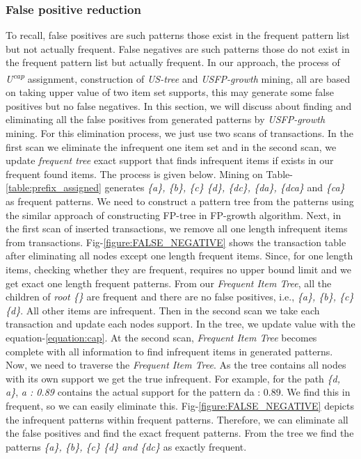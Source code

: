 \documentclass[conference]{IEEEtran}
\begin{document}
\subsubsection{False positive reduction}
To recall, false positives are such patterns those exist in the frequent pattern list but not actually frequent. False negatives are such patterns those do not exist in the frequent pattern list but actually frequent. In our approach, the process of \emph{U\textsuperscript{cap}} assignment, construction of \emph{US-tree} and \emph{USFP-growth} mining, all are based on taking upper value of two item set supports, this may generate some false positives but no false negatives. In this section, we will discuss about finding and eliminating all the false positives from generated patterns by \emph{USFP-growth} mining. For this elimination process, we just use two scans of transactions. In the first scan we eliminate the infrequent one item set and in the second scan, we update \emph{frequent tree} exact support that finds infrequent items if exists in our frequent found items. The process is given below. 
Mining on Table-\ref{table:prefix_assigned} generates \emph{\{a\}, \{b\}, \{c\} \{d\}, \{dc\}, \{da\}, \{dca\}} and \emph{\{ca\}} as frequent patterns. We need to construct a pattern tree from the patterns using the similar approach of constructing FP-tree in FP-growth algorithm.
Next, in the first scan of inserted transactions, we remove all one length infrequent items from transactions. Fig-\ref{figure:FALSE_NEGATIVE} shows the transaction table after eliminating all nodes except one length frequent items. Since, for one length items, checking whether they are frequent, requires no upper bound limit and we get exact one length frequent patterns. From our \emph{Frequent Item Tree}, all the children of \emph{root \{\}} are frequent and there are no false positives, i.e., \emph{\{a\}, \{b\}, \{c\} \{d\}}. All other items are infrequent. Then in the second scan we take each transaction and update each nodes support. In the tree, we update value with the equation-\ref{equation:cap}. At the second scan, \emph{Frequent Item Tree} becomes complete with all information to find infrequent items in generated patterns. Now, we need to traverse the \emph{Frequent Item Tree}. As the tree contains all nodes with its own support we get the true infrequent. For example, for the path \emph{\{d, a\}}, \emph{a : 0.89} contains the actual support for the pattern {da : 0.89}. We find this in frequent, so we can easily eliminate this. Fig-\ref{figure:FALSE_NEGATIVE} depicts the infrequent patterns within frequent patterns. Therefore, we can eliminate all the false positives and find the exact frequent patterns. From the tree we find the patterns \emph{\{a\}, \{b\}, \{c\} \{d\} and \{dc\}} as exactly frequent.
\end{document}
